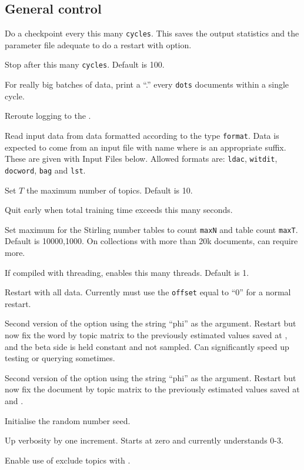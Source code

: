 \documentclass[a4paper,english]{article}
\begin{document}
\subsection{General control}
\begin{Description}\setlength{\itemsep}{0cm}
\item[\OptArg{-c}{cycles}] 
Do a checkpoint every this many \texttt{cycles}.
This saves the output statistics and the parameter file
adequate to do a restart with  option.
\item[\OptArg{-C}{cycles}] 
Stop after this many \texttt{cycles}.
Default is 100.
\item[\OptArg{-d}{dots}] 
For really big batches of data, print a 
``.'' every \texttt{dots} documents within a single cycle.
\item[\Opt{-e}]
Reroute logging to the .
\item[\OptArg{-f}{format}] 
Read input data from data formatted according to
the type \texttt{format}.  Data is expected to come from
an input file with name  where
 is an appropriate suffix.
These are given with Input Files below.
Allowed formats are:
\texttt{ldac}, \texttt{witdit}, \texttt{docword}, 
\texttt{bag}
and \texttt{lst}.
\item[\OptArg{-K}{topics}] 
Set $T$ the maximum number of topics.
Default is 10.
\item[\OptArg{-M}{maxtime}] 
Quit early when total training time exceeds this many seconds.
\item[\OptArg{-N}{maxN,maxT}] 
Set maximum for the Stirling number tables
to count \texttt{maxN} and table count \texttt{maxT}.
Default is 10000,1000.
On collections with more than 20k documents, can require more.
\item[\OptArg{-q}{threads}] If compiled with threading, enables
this many threads.  Default is 1.
\item[\OptArg{-r}{0}]
Restart with all data.  Currently must use the \texttt{offset} equal to ``0''
for a normal restart.
\item[\OptArg{-r}{phi}]
Second version of the  option
using the string ``phi'' as the argument.
Restart but now fix the word by topic matrix
to the previously estimated values saved at 
,
and the beta side is held constant and not sampled.
Can significantly speed up testing or querying sometimes.
\item[\OptArg{-r}{theta}]
Second version of the  option
using the string ``phi'' as the argument.
Restart but now fix the document by topic matrix
to the previously estimated values saved at 
 and .
\item[\OptArg{-s}{seed}]
Initialise the random number seed.
\item[\Opt{-v}] Up verbosity by one increment.
Starts at zero and currently understands 0-3.
\item[\Opt{-x}] Enable use of exclude topics with .
\end{Description}
\end{document}
